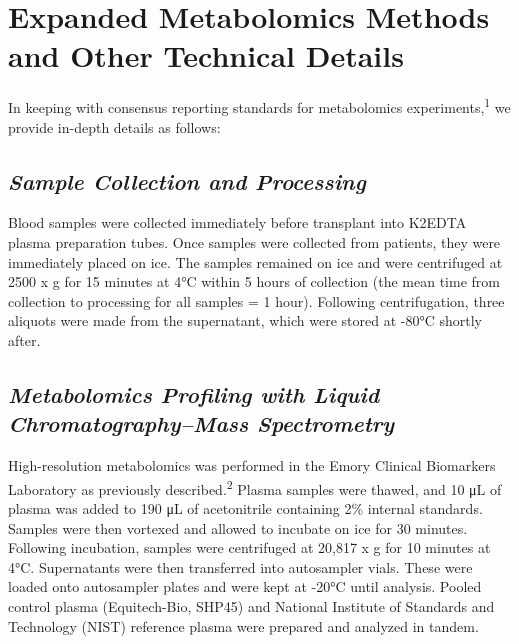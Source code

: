 \documentclass[
]{article}
\begin{document}




\section{\texorpdfstring{\textbf{Expanded Metabolomics Methods and Other
Technical
Details}}{Expanded Metabolomics Methods and Other Technical Details}}\label{expanded-metabolomics-methods-and-other-technical-details}

In keeping with consensus reporting standards for metabolomics
experiments,\textsuperscript{1} we provide in-depth details as follows:

\subsection{\texorpdfstring{\emph{Sample Collection and
Processing}}{Sample Collection and Processing}}\label{sample-collection-and-processing}

Blood samples were collected immediately before transplant into K2EDTA
plasma preparation tubes. Once samples were collected from patients,
they were immediately placed on ice. The samples remained on ice and
were centrifuged at 2500 x g for 15 minutes at 4°C within 5 hours of
collection (the mean time from collection to processing for all samples
= 1 hour). Following centrifugation, three aliquots were made from the
supernatant, which were stored at -80°C shortly after.

\subsection{\texorpdfstring{\emph{Metabolomics Profiling with Liquid
Chromatography--Mass
Spectrometry}}{Metabolomics Profiling with Liquid Chromatography--Mass Spectrometry}}\label{metabolomics-profiling-with-liquid-chromatographymass-spectrometry}

High-resolution metabolomics was performed in the Emory Clinical
Biomarkers Laboratory as previously described.\textsuperscript{2} Plasma
samples were thawed, and 10 μL of plasma was added to 190 μL of
acetonitrile containing 2\% internal standards. Samples were then
vortexed and allowed to incubate on ice for 30 minutes. Following
incubation, samples were centrifuged at 20,817 x g for 10 minutes at
4°C. Supernatants were then transferred into autosampler vials. These
were loaded onto autosampler plates and were kept at -20°C until
analysis. Pooled control plasma (Equitech-Bio, SHP45) and National
Institute of Standards and Technology (NIST) reference plasma were
prepared and analyzed in tandem.
\end{document}
